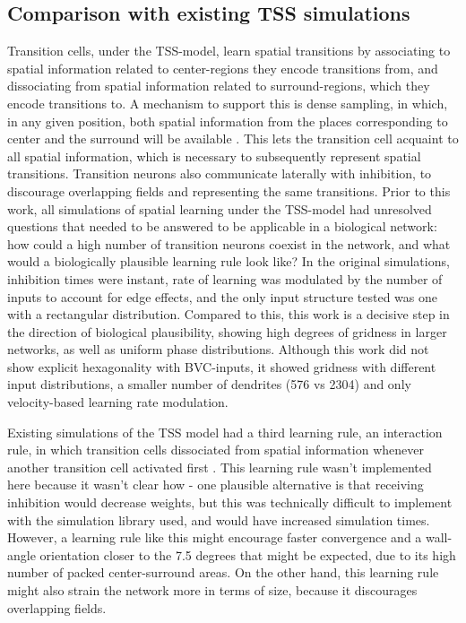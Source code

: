 \documentclass{article}
\begin{document}
    \subsection{Comparison with existing TSS simulations} \label{TSS model comparison}

    Transition cells, under the TSS-model, learn spatial transitions by associating to spatial information related to center-regions they encode transitions from, and dissociating from spatial information related to surround-regions, which they encode transitions to. A mechanism to support this is dense sampling, in which, in any given position, both spatial information from the places corresponding to center and the surround will be available \parencite{Waniek2020}. This lets the transition cell acquaint to all spatial information, which is necessary to subsequently represent spatial transitions. Transition neurons also communicate laterally with inhibition, to discourage overlapping fields and representing the same transitions. 
    Prior to this work, all simulations of spatial learning under the TSS-model had unresolved questions that needed to be answered to be applicable in a biological network: how could a high number of transition neurons coexist in the network, and what would a biologically plausible learning rule look like? In the original simulations, inhibition times were instant, rate of learning was modulated by the number of inputs to account for edge effects, and the only input structure tested was one with a rectangular distribution.
    Compared to this, this work is a decisive step in the direction of biological plausibility, showing high degrees of gridness in larger networks, as well as uniform phase distributions. Although this work did not show explicit hexagonality with BVC-inputs, it showed gridness with different input distributions, a smaller number of dendrites (576 vs 2304) and only velocity-based learning rate modulation.

    Existing simulations of the TSS model had a third learning rule, an interaction rule, in which transition cells dissociated from spatial information whenever another transition cell activated first \parencite{Waniek2017}. This learning rule wasn't implemented here because it wasn't clear how - one plausible alternative is that receiving inhibition would decrease weights, but this was technically difficult to implement with the simulation library used, and would have increased simulation times. However, a learning rule like this might encourage faster convergence and a wall-angle orientation closer to the 7.5 degrees that might be expected, due to its high number of packed center-surround areas. On the other hand, this learning rule might also strain the network more in terms of size, because it discourages overlapping fields.
\end{document}
